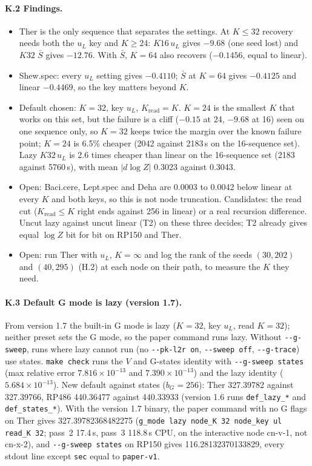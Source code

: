 \documentclass[11pt]{article}
\begin{document}
\paragraph{K.2 Findings.}
\begin{itemize}[leftmargin=*]
  \item Ther is the only sequence that separates the settings. At $K\le32$ recovery needs both the $u_L$ key and $K\ge24$: $K16\,u_L$ gives $-9.68$ (one seed lost) and $K32$ $\bar S$ gives $-12.76$. With $\bar S$, $K=64$ also recovers ($-0.1456$, equal to linear).
  \item Shew.spec: every $u_L$ setting gives $-0.4110$; $\bar S$ at $K=64$ gives $-0.4125$ and linear $-0.4469$, so the key matters beyond $K$.
  \item Default chosen: $K=32$, key $u_L$, $K_{\mathrm{read}}=K$. $K=24$ is the smallest $K$ that works on this set, but the failure is a cliff ($-0.15$ at 24, $-9.68$ at 16) seen on one sequence only, so $K=32$ keeps twice the margin over the known failure point; $K=24$ is 6.5\% cheaper (2042 against 2183\,s on the 16-sequence set). Lazy $K32\,u_L$ is 2.6 times cheaper than linear on the 16-sequence set (2183 against 5760\,s), with mean $|d\log Z|$ 0.3023 against 0.3043.
  \item Open: Baci.cere, Lept.spec and Deha are 0.0003 to 0.0042 below linear at every $K$ and both keys, so this is not node truncation. Candidates: the read cut ($K_{\mathrm{read}}\le K$ right ends against 256 in linear) or a real recursion difference. Uncut lazy against uncut linear (T2) on these three decides; T2 already gives equal $\log Z$ bit for bit on RP150 and Ther.
  \item Open: run Ther with $u_L$, $K=\infty$ and log the rank of the seeds $(30,202)$ and $(40,295)$ (H.2) at each node on their path, to measure the $K$ they need.
\end{itemize}

\paragraph{K.3 Default G mode is lazy (version 1.7).} From version 1.7 the built-in G mode is lazy ($K=32$, key $u_L$, read $K=32$); neither preset sets the G mode, so the paper command runs lazy. Without \texttt{-{}-g-sweep}, runs where lazy cannot run (no \texttt{-{}-pk-l2r on}, \texttt{-{}-sweep off}, \texttt{-{}-g-trace}) use states. \texttt{make check} runs the $V$ and G-states identity with \texttt{-{}-g-sweep states} (max relative error $7.816\times10^{-13}$ and $7.390\times10^{-13}$) and the lazy identity ($5.684\times10^{-13}$). New default against states ($b_G=256$): Ther 327.39782 against 327.39766, RP486 440.36477 against 440.33933 (version 1.6 runs \texttt{def\_lazy\_*} and \texttt{def\_states\_*}). With the version 1.7 binary, the paper command with no G flags on Ther gives 327.39782368482275 (\texttt{g\_mode lazy node\_K 32 node\_key ul read\_K 32}; pass~2 17.4\,s, pass~3 118.8\,s CPU, on the interactive node cn-v-1, not cn-x-2), and \texttt{-{}-g-sweep states} on RP150 gives 116.28132370133829, every stdout line except \texttt{sec} equal to \texttt{paper-v1}.
\end{document}
